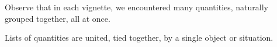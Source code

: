 %
%
%

\newpage
Observe that in each vignette, we encountered many quantities, naturally grouped together, all at once.


Lists of quantities are united, tied together, by a single object or situation.  


